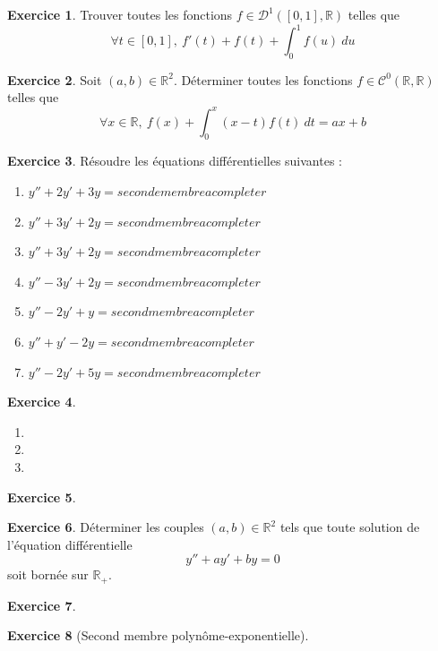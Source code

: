 \documentclass[french]{book}
\newcommand{\R}{\mathbb{R}}
\theoremstyle{definition}
\newtheorem{ex}{Exercice}[chapter]
\theoremstyle{theorem}
\theoremstyle{remark}
\begin{document}
\begin{ex}
	Trouver toutes les fonctions $f\in\mathcal{D}^1([0,1],\R)$ telles que $$\forall t\in[0,1],\ f'(t)+f(t)+\int_{0}^{1}f(u)\ du$$
\end{ex}

\begin{ex}
	Soit $(a,b)\in\R^2$. Déterminer toutes les fonctions $f\in\mathcal{C}^0(\R,\R)$ telles que $$\forall x\in\R,\ f(x)+\int_{0}^{x}(x-t)f(t)\ dt=ax+b$$
\end{ex}

\begin{ex}
	Résoudre les équations différentielles suivantes : 
	\begin{enumerate}
		\item $y''+2y'+3y=secondemembreacompleter$
		\item $y''+3y'+2y=secondmembreacompleter$
		\item $y''+3y'+2y=secondmembreacompleter$
		\item $y''-3y'+2y=secondmembreacompleter$
		\item $y''-2y'+y=secondmembreacompleter$
		\item $y''+y'-2y=secondmembreacompleter$
		\item $y''-2y'+5y=secondmembreacompleter$
	\end{enumerate}
\end{ex}

\begin{ex}
	\begin{enumerate}
		\item 
		\item 
		\item 
	\end{enumerate}
\end{ex}

\begin{ex}
	
\end{ex}

\begin{ex}
	Déterminer les couples $(a,b)\in\R^2$ tels que toute solution de l'équation différentielle $$y''+ay'+by=0$$ soit bornée sur $\R_+$.
\end{ex}

\begin{ex}
	
\end{ex}

\begin{ex}[Second membre polynôme-exponentielle]
	
\end{ex}
\end{document}
